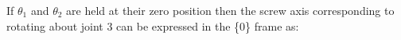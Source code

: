 \documentclass[preview]{standalone}
\begin{document}
\begin{center}
If $\theta_1$ and $\theta_2$ are held at their zero position then the screw axis corresponding to rotating about joint 3 can be expressed in the \{0\} frame as:
\end{center}
\end{document}
